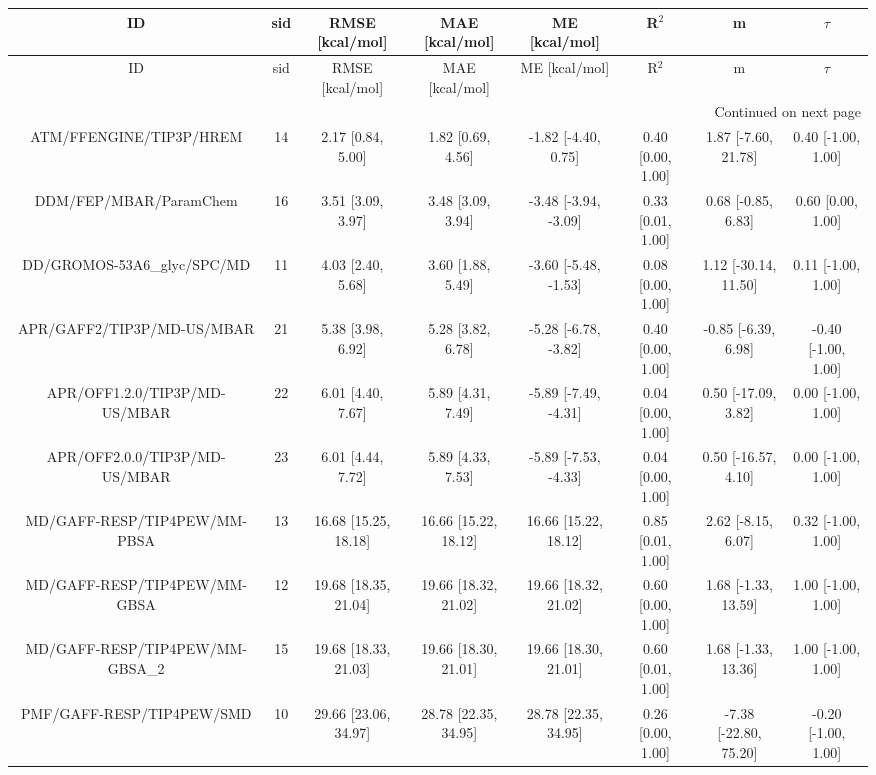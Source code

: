 \documentclass[8pt]{article}
\begin{document}
\begin{center}
\begin{footnotesize}
\begin{longtable}{|cccccccc|}
\toprule
                             ID & sid &      RMSE [kcal/mol] &       MAE [kcal/mol] &        ME [kcal/mol] &             R$^2$ &                     m &              $\tau$ \\
\midrule
\endfirsthead

\toprule
                             ID & sid &      RMSE [kcal/mol] &       MAE [kcal/mol] &        ME [kcal/mol] &             R$^2$ &                     m &              $\tau$ \\
\midrule
\endhead
\midrule
\multicolumn{8}{r}{{Continued on next page}} \\
\midrule
\endfoot

\bottomrule
\endlastfoot
        ATM/FFENGINE/TIP3P/HREM &  14 &    2.17 [0.84, 5.00] &    1.82 [0.69, 4.56] &  -1.82 [-4.40, 0.75] & 0.40 [0.00, 1.00] &   1.87 [-7.60, 21.78] &  0.40 [-1.00, 1.00] \\
         DDM/FEP/MBAR/ParamChem &  16 &    3.51 [3.09, 3.97] &    3.48 [3.09, 3.94] & -3.48 [-3.94, -3.09] & 0.33 [0.01, 1.00] &    0.68 [-0.85, 6.83] &   0.60 [0.00, 1.00] \\
    DD/GROMOS-53A6\_glyc/SPC/MD &  11 &    4.03 [2.40, 5.68] &    3.60 [1.88, 5.49] & -3.60 [-5.48, -1.53] & 0.08 [0.00, 1.00] &  1.12 [-30.14, 11.50] &  0.11 [-1.00, 1.00] \\
     APR/GAFF2/TIP3P/MD-US/MBAR &  21 &    5.38 [3.98, 6.92] &    5.28 [3.82, 6.78] & -5.28 [-6.78, -3.82] & 0.40 [0.00, 1.00] &   -0.85 [-6.39, 6.98] & -0.40 [-1.00, 1.00] \\
  APR/OFF1.2.0/TIP3P/MD-US/MBAR &  22 &    6.01 [4.40, 7.67] &    5.89 [4.31, 7.49] & -5.89 [-7.49, -4.31] & 0.04 [0.00, 1.00] &   0.50 [-17.09, 3.82] &  0.00 [-1.00, 1.00] \\
  APR/OFF2.0.0/TIP3P/MD-US/MBAR &  23 &    6.01 [4.44, 7.72] &    5.89 [4.33, 7.53] & -5.89 [-7.53, -4.33] & 0.04 [0.00, 1.00] &   0.50 [-16.57, 4.10] &  0.00 [-1.00, 1.00] \\
   MD/GAFF-RESP/TIP4PEW/MM-PBSA &  13 & 16.68 [15.25, 18.18] & 16.66 [15.22, 18.12] & 16.66 [15.22, 18.12] & 0.85 [0.01, 1.00] &    2.62 [-8.15, 6.07] &  0.32 [-1.00, 1.00] \\
   MD/GAFF-RESP/TIP4PEW/MM-GBSA &  12 & 19.68 [18.35, 21.04] & 19.66 [18.32, 21.02] & 19.66 [18.32, 21.02] & 0.60 [0.00, 1.00] &   1.68 [-1.33, 13.59] &  1.00 [-1.00, 1.00] \\
MD/GAFF-RESP/TIP4PEW/MM-GBSA\_2 &  15 & 19.68 [18.33, 21.03] & 19.66 [18.30, 21.01] & 19.66 [18.30, 21.01] & 0.60 [0.01, 1.00] &   1.68 [-1.33, 13.36] &  1.00 [-1.00, 1.00] \\
      PMF/GAFF-RESP/TIP4PEW/SMD &  10 & 29.66 [23.06, 34.97] & 28.78 [22.35, 34.95] & 28.78 [22.35, 34.95] & 0.26 [0.00, 1.00] & -7.38 [-22.80, 75.20] & -0.20 [-1.00, 1.00] \\
\end{longtable}
\end{footnotesize}
\end{center}
\end{document}
